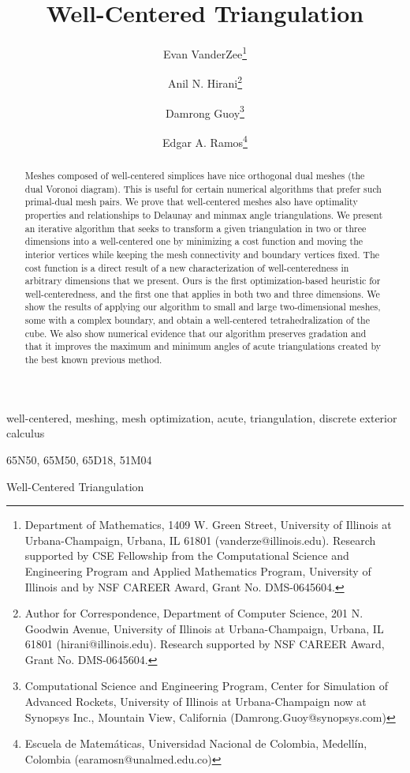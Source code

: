 \documentclass[final]{siamltex}
\title{Well-Centered Triangulation\footnotemark[5]}
\author{
Evan VanderZee\thanks{Department of Mathematics, 1409 W. Green Street,
University of Illinois at Urbana-Champaign, Urbana, IL 61801
(vanderze@illinois.edu). Research supported by CSE Fellowship from the 
Computational Science and Engineering Program and Applied Mathematics 
Program, University of Illinois and by NSF CAREER Award, Grant No. DMS-0645604.}
\and Anil N. Hirani\thanks{Author for Correspondence,  
Department of Computer Science,
201 N. Goodwin Avenue, 
University of Illinois at Urbana-Champaign, Urbana, IL 61801
(hirani@illinois.edu). Research supported by NSF CAREER Award, 
Grant No. DMS-0645604.}
\and Damrong Guoy\thanks{Computational Science and Engineering
Program, Center for Simulation of Advanced Rockets,
University of Illinois at Urbana-Champaign now at
Synopsys Inc., Mountain View, California
(Damrong.Guoy@synopsys.com)}
\and Edgar A. Ramos\thanks{Escuela de Matem\'aticas,
Universidad Nacional de Colombia,
Medell\'in, Colombia
\mbox{(earamosn@unalmed.edu.co)}}
}
\begin{document}
\renewcommand{\thefootnote}{\fnsymbol{footnote}}
\renewcommand{\thefootnote}{\arabic{footnote}}
\maketitle

\begin{abstract}
  Meshes composed of well-centered simplices have nice orthogonal dual
  meshes (the dual Voronoi diagram). This is useful for certain
  numerical algorithms that prefer such primal-dual mesh pairs. We
  prove that well-centered meshes also have optimality properties and
  relationships to Delaunay and minmax angle triangulations. We
  present an iterative algorithm that seeks to transform a given
  triangulation in two or three dimensions into a well-centered one by
  minimizing a cost function and moving the interior vertices while
  keeping the mesh connectivity and boundary vertices fixed. The cost
  function is a direct result of a new characterization of
  well-centeredness in arbitrary dimensions that we present. Ours is
  the first optimization-based heuristic for well-centeredness, and
  the first one that applies in both two and three dimensions. We show
  the results of applying our algorithm to small and large
  two-dimensional meshes, some with a complex boundary, and obtain a
  well-centered tetrahedralization of the cube.  We also show
  numerical evidence that our algorithm preserves gradation and that
  it improves the maximum and minimum angles of acute triangulations
  created by the best known previous method.
\end{abstract}

\begin{keywords}
  well-centered, meshing, mesh optimization, acute, triangulation,
  discrete exterior calculus
\end{keywords}

\begin{AMS}
65N50,
65M50,
65D18,
51M04


\end{AMS}



\pagestyle{myheadings}
\thispagestyle{plain}
{Well-Centered Triangulation}
\end{document}
